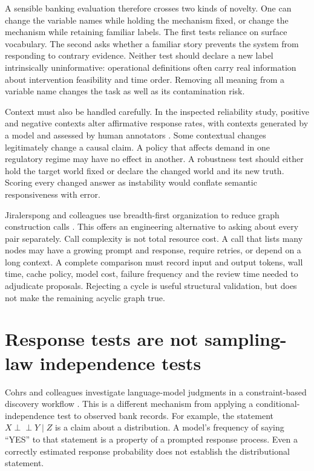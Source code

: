A sensible banking evaluation therefore crosses two kinds of novelty. One can
change the variable names while holding the mechanism fixed, or change the
mechanism while retaining familiar labels. The first tests reliance on
surface vocabulary. The second asks whether a familiar story prevents the
system from responding to contrary evidence. Neither test should declare a
new label intrinsically uninformative: operational definitions often carry
real information about intervention feasibility and time order. Removing all
meaning from a variable name changes the task as well as its contamination risk.

Context must also be handled carefully. In the inspected reliability study,
positive and negative contexts alter affirmative response rates, with contexts
generated by a model and assessed by human annotators
\citep{v12_la_2407_19638}. Some contextual changes legitimately change a causal
claim. A policy that affects demand in one regulatory regime may have no effect
in another. A robustness test should either hold the target world fixed or
declare the changed world and its new truth. Scoring every changed answer as
instability would conflate semantic responsiveness with error.

Jiralerspong and colleagues use breadth-first organization to reduce graph
construction calls \citep{v12_la_2402_01207}. This offers an engineering
alternative to asking about every pair separately. Call complexity is not total
resource cost. A call that lists many nodes may have a growing prompt and
response, require retries, or depend on a long context. A complete comparison
must record input and output tokens, wall time, cache policy, model cost,
failure frequency and the review time needed to adjudicate proposals. Rejecting
a cycle is useful structural validation, but does not make the remaining
acyclic graph true.

\section{Response tests are not sampling-law independence tests}

Cohrs and colleagues investigate language-model judgments in a
constraint-based discovery workflow \citep{v12_la_2406_07378}. This is a
different mechanism from applying a conditional-independence test to observed
bank records. For example, the statement
$X\mathrel{\perp\!\!\!\perp}Y\mid Z$ is a claim about a distribution. A
model's frequency of saying ``YES'' to that statement is a property of a
prompted response process. Even a correctly estimated response probability
does not establish the distributional statement.

